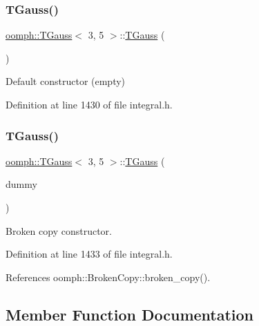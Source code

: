 \subsubsection{\texorpdfstring{T\+Gauss()}{TGauss()}\hspace{0.1cm}{\footnotesize\ttfamily [1/2]}}
{\footnotesize\ttfamily \hyperlink{classoomph_1_1TGauss}{oomph\+::\+T\+Gauss}$<$ 3, 5 $>$\+::\hyperlink{classoomph_1_1TGauss}{T\+Gauss} (\begin{DoxyParamCaption}{ }\end{DoxyParamCaption})\hspace{0.3cm}{\ttfamily [inline]}}



Default constructor (empty) 



Definition at line 1430 of file integral.\+h.

\mbox{\label{classoomph_1_1TGauss_3_013_00_015_01_4_a79dfc30e5140eca7f6d99aca8636bc69}} 
\subsubsection{\texorpdfstring{T\+Gauss()}{TGauss()}\hspace{0.1cm}{\footnotesize\ttfamily [2/2]}}
{\footnotesize\ttfamily \hyperlink{classoomph_1_1TGauss}{oomph\+::\+T\+Gauss}$<$ 3, 5 $>$\+::\hyperlink{classoomph_1_1TGauss}{T\+Gauss} (\begin{DoxyParamCaption}\item[{const \hyperlink{classoomph_1_1TGauss}{T\+Gauss}$<$ 3, 5 $>$ \&}]{dummy }\end{DoxyParamCaption})\hspace{0.3cm}{\ttfamily [inline]}}



Broken copy constructor. 



Definition at line 1433 of file integral.\+h.



References oomph\+::\+Broken\+Copy\+::broken\+\_\+copy().



\subsection{Member Function Documentation}
\mbox{\label{classoomph_1_1TGauss_3_013_00_015_01_4_aa361891b362cdabd12a9aa6846bcadb6}} 
